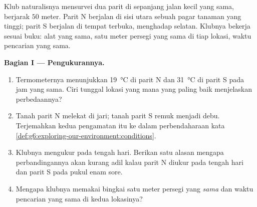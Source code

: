 \begin{problem}\label{pb:g6:exploring-our-environment:1}
Klub naturalisnya mensurvei dua parit di sepanjang jalan kecil yang
sama, berjarak $50$ meter. Parit N berjalan di sisi utara sebuah pagar
tanaman yang tinggi; parit S berjalan di tempat terbuka, menghadap
selatan. Klubnya bekerja sesuai buku: alat yang sama, satu meter
persegi yang sama di tiap lokasi, waktu pencarian yang sama.

\medskip\noindent\textbf{Bagian I --- Pengukurannya.}
\begin{enumerate}
  \item Termometernya menunjukkan \qty{19}{\degreeCelsius} di parit N
        dan \qty{31}{\degreeCelsius} di parit S pada jam yang sama.
        Ciri tunggal lokasi yang mana yang paling baik menjelaskan
        perbedaannya?
  \item Tanah parit N melekat di jari; tanah parit S remuk menjadi
        debu. Terjemahkan kedua pengamatan itu ke dalam perbendaharaan
        kata \cref{def:g6:exploring-our-environment:conditions}.
  \item Klubnya mengukur pada tengah hari. Berikan satu alasan mengapa
        perbandingannya akan kurang adil kalau parit N diukur pada
        tengah hari dan parit S pada pukul enam sore.
  \item Mengapa klubnya memakai bingkai satu meter persegi yang
        \emph{sama} dan waktu pencarian yang sama di kedua lokasinya?
\end{enumerate}


\end{problem}

